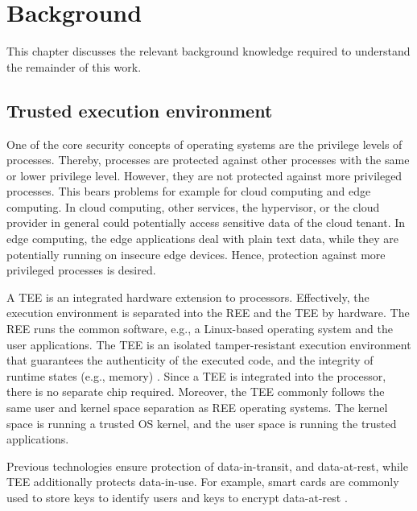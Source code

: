 
\chapter{Background}\label{chapter:background}

This chapter discusses the relevant background knowledge required to understand the remainder of this work.

\section{Trusted execution environment}

One of the core security concepts of operating systems are the privilege levels of processes. Thereby, processes are protected against other processes with the same or lower privilege level. However, they are not protected against more privileged processes. This bears problems for example for cloud computing and edge computing. In cloud computing, other services, the hypervisor, or the cloud provider in general could potentially access sensitive data of the cloud tenant. In edge computing, the edge applications deal with plain text data, while they are potentially running on insecure edge devices. Hence, protection against more privileged processes is desired.


A \ac{TEE} is an integrated hardware extension to processors. Effectively, the execution environment is separated into the \ac{REE} and the \ac{TEE} by hardware. The \ac{REE} runs the common software, e.g., a Linux-based operating system and the user applications.
The TEE is an isolated tamper-resistant execution environment that guarantees the authenticity of the executed code, and the integrity of runtime states (e.g., memory) \cite{Sabt2015}.
Since a \ac{TEE} is integrated into the processor, there is no separate chip required.
Moreover, the \ac{TEE} commonly follows the same user and kernel space separation as \ac{REE} operating systems. The kernel space is running a trusted OS kernel, and the user space is running the trusted applications.

Previous technologies ensure protection of data-in-transit, and data-at-rest, while \ac{TEE} additionally protects data-in-use.
For example, smart cards are commonly used to store keys to identify users and keys to encrypt data-at-rest \cite{Arthur2015}.

